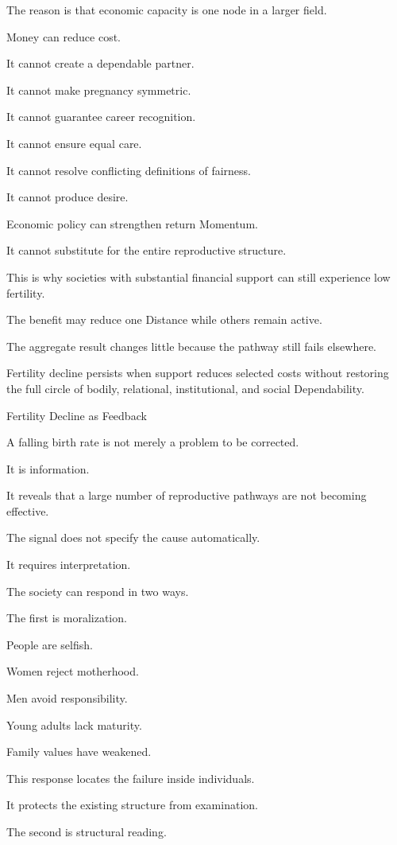 The reason is that economic capacity is one node in a larger field.

Money can reduce cost.

It cannot create a dependable partner.

It cannot make pregnancy symmetric.

It cannot guarantee career recognition.

It cannot ensure equal care.

It cannot resolve conflicting definitions of fairness.

It cannot produce desire.

Economic policy can strengthen return Momentum.

It cannot substitute for the entire reproductive structure.

This is why societies with substantial financial support can still experience low fertility.

The benefit may reduce one Distance while others remain active.

The aggregate result changes little because the pathway still fails elsewhere.

Fertility decline persists when support reduces selected costs without restoring the full circle of bodily, relational, institutional, and social Dependability.

Fertility Decline as Feedback

A falling birth rate is not merely a problem to be corrected.

It is information.

It reveals that a large number of reproductive pathways are not becoming effective.

The signal does not specify the cause automatically.

It requires interpretation.

The society can respond in two ways.

The first is moralization.

People are selfish.

Women reject motherhood.

Men avoid responsibility.

Young adults lack maturity.

Family values have weakened.

This response locates the failure inside individuals.

It protects the existing structure from examination.

The second is structural reading.

